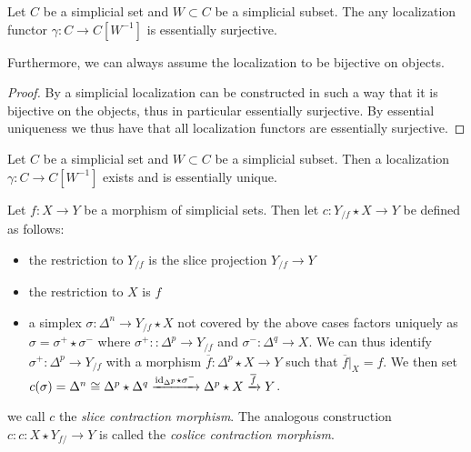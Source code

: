 \begin{lemma}\label{prop:simpLocEssSurj}
    Let $C$ be a simplicial set and $W\subset C$ be a simplicial subset.
    The any localization functor $\gamma\colon C\to C[W^{-1}]$ is essentially surjective.

    Furthermore, we can always assume the localization to be bijective on objects.
    \begin{proof}
        By %
        a simplicial localization can be constructed in such a way that it is bijective on the objects, thus in particular essentially surjective. %
        By essential uniqueness we thus have that all localization functors are essentially surjective.
    \end{proof}
\end{lemma}
\begin{prop} %
    Let $C$ be a simplicial set and $W\subset C$ be a simplicial subset.
    Then a localization $\gamma\colon C\to C[W^{-1}]$ exists and is essentially unique.
\end{prop}
\begin{construction}%
    Let $f\colon X\to Y$ be a morphism of simplicial sets.
    Then let $c\colon Y_{/f}\star X\to Y$ be defined as follows:
    \begin{itemize}
        \item the restriction to $Y_{/f}$ is the slice projection $Y_{/f}\to Y$
        \item the restriction to $X$ is $f$
        \item a simplex $\sigma\colon\Delta^n\to Y_{/f}\star X$ not covered by the above cases factors uniquely as $\sigma=\sigma^+\star\sigma^-$ where $\sigma^+\colon\colon\Delta^p\to Y_{/f}$ and $\sigma^-\colon\Delta^q\to X$.
              We can thus identify $\sigma^+\colon\Delta^p\to Y_{/f}$ with a morphism $\overline{f}\colon\Delta^p\star X\to Y$ such that $\overline{f}|_{X}=f$.
              We then set $c(\sigma)=\Delta^n\cong\Delta^p\star\Delta^q\xrightarrow{\text{id}_{\Delta^p}\star\sigma^-}\Delta^p\star X\xrightarrow{\overline{f}} Y$.
    \end{itemize}
    we call $c$ the \emph{slice contraction morphism}.
    The analogous construction $c\colon c\colon X\star Y_{f/}\to Y$ is called the \emph{coslice contraction morphism}.
\end{construction}
